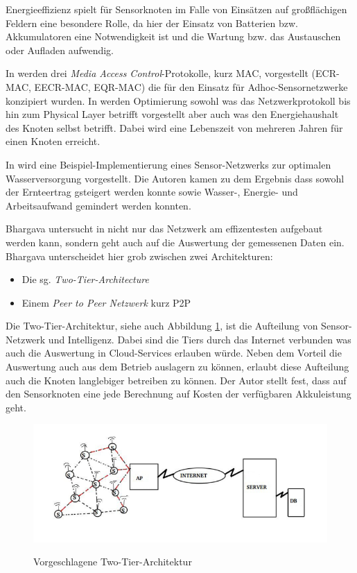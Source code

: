 Energieeffizienz spielt für Sensorknoten im Falle von Einsätzen auf großflächigen Feldern eine besondere Rolle, da hier der Einsatz von Batterien bzw. Akkumulatoren eine Notwendigkeit ist und die Wartung bzw. das Austauschen oder Aufladen aufwendig. 

In \cite{conf:Zia2013} werden drei \textit{Media Access Control}-Protokolle, kurz MAC, vorgestellt (ECR-MAC, EECR-MAC, EQR-MAC) die für den Einsatz für Adhoc-Sensornetzwerke konzipiert wurden. In \cite{jour:Jelicic2013} werden Optimierung sowohl was das Netzwerkprotokoll bis hin zum Physical Layer betrifft vorgestellt aber auch was den Energiehaushalt des Knoten selbst betrifft. Dabei wird eine Lebenszeit von mehreren Jahren für einen Knoten erreicht.

In \cite{jour:Nandurkar2014} wird eine Beispiel-Implementierung eines Sensor-Netzwerks zur optimalen Wasserversorgung vorgestellt. Die Autoren kamen zu dem Ergebnis dass sowohl der Ernteertrag gsteigert werden konnte sowie Wasser-, Energie- und Arbeitsaufwand gemindert werden konnten.

Bhargava untersucht in \cite{jour:Bhargava2014} nicht nur das Netzwerk am effizentesten aufgebaut werden kann, sondern geht auch auf die Auswertung der gemessenen Daten ein. Bhargava unterscheidet hier grob zwischen zwei Architekturen:
\begin{itemize}
	\item Die sg. \textit{Two-Tier-Architecture}
	\item Einem \textit{Peer to Peer Netzwerk} kurz P2P
\end{itemize}

Die Two-Tier-Architektur, siehe auch Abbildung \ref{fig:two_tier_architecture}, ist die Aufteilung von Sensor-Netzwerk und Intelligenz. Dabei sind die Tiers durch das Internet verbunden was auch die Auswertung in Cloud-Services erlauben würde. Neben dem Vorteil die Auswertung auch aus dem Betrieb auslagern zu können, erlaubt diese Aufteilung auch die Knoten langlebiger betreiben zu können. Der Autor stellt fest, dass auf den Sensorknoten eine jede Berechnung auf Kosten der verfügbaren Akkuleistung geht.\cite{jour:Bhargava2014}

\begin{figure}[h]
 \includegraphics[scale=0.65,natwidth=\textwidth]{figures/sensors/two_tier_architecture.png}
 \centering
 \label{fig:two_tier_architecture}
 \caption{Vorgeschlagene Two-Tier-Architektur \cite{jour:Bhargava2014}}
\end{figure}

